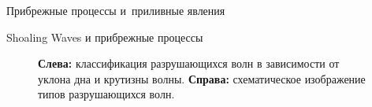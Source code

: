 \begin{chapter}{Прибрежные процессы и~приливные явления}
\begin{section}{Shoaling Waves и прибрежные процессы}
\begin{figure}[t!]
\begin{centering}
\end{centering}
\caption{\textbf{Слева:} классификация 
разрушающихся волн в зависимости от уклона дна и крутизны волны. 
\textbf{Справа:} схематическое изображение типов разрушающихся 
волн.~\cite[стр.~79, 81]{Horikawa:1988}}
\label{fig:breakers}
\end{figure}
%
%


\end{section}
\end{chapter}
